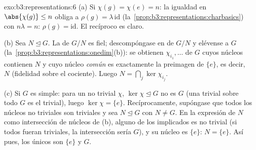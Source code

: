 \begin{solution}{exo:b3:representations:6}
(a) Si $\chi(g) = \chi(e) = n$: la igualdad en $\abs{\chi(g)} \leq n$
obliga a $\rho(g) = \lambda\,\mathrm{id}$
(la~\cref{prop:b3:representations:charbasics}) con $n\lambda = n$:
$\rho(g) = \mathrm{id}$. El recíproco es claro.

(b) Sea $N \trianglelefteq G$. La
 de $G/N$
es fiel; descompóngase en
 de $G/N$ y elévense a
$G$ (la~\cref{prop:b3:representations:onedim}(b)): se obtienen
 $\chi_{i_1}, \dots$ de
$G$ cuyos núcleos contienen $N$ y cuyo núcleo \emph{común} es
exactamente la preimagen de $\{e\}$, es decir, $N$ (fidelidad sobre el
cociente). Luego $N = \bigcap_j \ker\chi_{i_j}$.

(c) Si $G$ es simple: para un
 no trivial $\chi$,
$\ker\chi \trianglelefteq G$ no es $G$ (una
 trivial
sobre todo $G$ es el 
trivial), luego $\ker\chi = \{e\}$. Recíprocamente, supóngase que todos
los núcleos no triviales son triviales y sea $N \trianglelefteq G$ con
$N \neq
G$. En la expresión de $N$ como intersección de núcleos de (b), alguno
de los  implicados
es no trivial (si todos fueran triviales, la intersección sería $G$), y
su núcleo es $\{e\}$: $N =
\{e\}$. Así pues, los únicos  son $\{e\}$ y $G$.
\end{solution}

